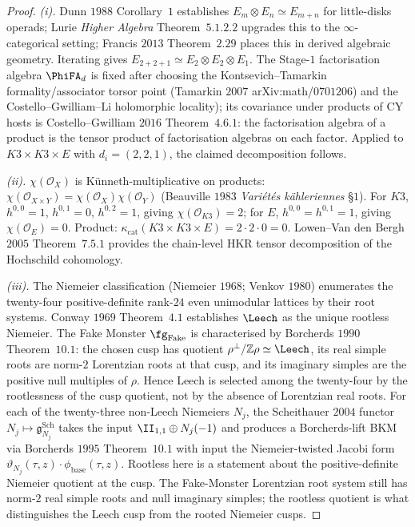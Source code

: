 \begin{proof}
\emph{(i).} Dunn $1988$ Corollary~$1$ establishes $E_m \otimes E_n
\simeq E_{m+n}$ for little-disks operads; Lurie \emph{Higher Algebra}
Theorem~$5.1.2.2$ upgrades this to the $\infty$-categorical setting;
Francis $2013$ Theorem~$2.29$ places this in derived algebraic
geometry. Iterating gives $E_{2 + 2 + 1} \simeq E_2 \otimes E_2 \otimes
E_1$. The Stage-$1$ factorisation algebra $\PhiFA_d$ is fixed after
choosing the Kontsevich--Tamarkin formality/associator torsor point
(Tamarkin $2007$ arXiv:math/$0701206$) and the
Costello--Gwilliam--Li holomorphic
locality); its covariance under products of CY hosts is
Costello--Gwilliam $2016$ Theorem~$4.6.1$: the factorisation algebra
of a product is the tensor product of factorisation algebras on each
factor. Applied to $K3 \times K3 \times E$ with $d_i = (2, 2, 1)$,
the claimed decomposition follows.

\emph{(ii).} $\chi(\mathcal O_X)$ is K\"unneth-multiplicative on
products: $\chi(\mathcal O_{X \times Y}) = \chi(\mathcal O_X)
\chi(\mathcal O_Y)$ (Beauville $1983$ \emph{Vari\'et\'es k\"ahleriennes}
\S$1$). For $K3$, $h^{0, 0} = 1$, $h^{0, 1} = 0$, $h^{0, 2} = 1$,
giving $\chi(\mathcal O_{K3}) = 2$; for $E$, $h^{0, 0} = h^{0, 1} = 1$,
giving $\chi(\mathcal O_E) = 0$. Product:
$\kappa_{\mathrm{cat}}(K3 \times K3 \times E) = 2 \cdot 2 \cdot 0 = 0$.
Lowen--Van den Bergh $2005$ Theorem~$7.5.1$ provides the chain-level
HKR tensor decomposition of the Hochschild cohomology.

\emph{(iii).} The Niemeier classification (Niemeier $1968$; Venkov
$1980$) enumerates the twenty-four positive-definite rank-$24$ even
unimodular lattices by their root systems. Conway $1969$ Theorem~$4.1$
establishes $\Leech$ as the unique rootless Niemeier. The Fake
Monster $\fg_{\mathrm{Fake}}$ is characterised by Borcherds $1990$
Theorem~$10.1$: the chosen cusp has quotient
\(\rho^\perp/\mathbb Z\rho\simeq\Leech\), its real simple roots are
norm-$2$ Lorentzian roots at that cusp, and its imaginary simples are
the positive null multiples of \(\rho\). Hence Leech is selected among
the twenty-four by the rootlessness of the cusp quotient, not by the
absence of Lorentzian real roots. For each of the
twenty-three non-Leech Niemeiers $N_j$, the Scheithauer $2004$
functor $N_j \mapsto \mathfrak g^{\mathrm{Sch}}_{N_j}$ takes the
input $\II_{1, 1} \oplus N_j(-1)$ and produces a Borcherds-lift
BKM via Borcherds $1995$ Theorem~$10.1$ with input the
Niemeier-twisted Jacobi form $\vartheta_{N_j}(\tau, z) \cdot
\phi_{\mathrm{base}}(\tau, z)$. Rootless here is a statement about the
positive-definite Niemeier quotient at the cusp. The Fake-Monster
Lorentzian root system still has norm-$2$ real simple roots and null
imaginary simples; the rootless quotient is what distinguishes the
Leech cusp from the rooted Niemeier cusps.


\end{proof}

